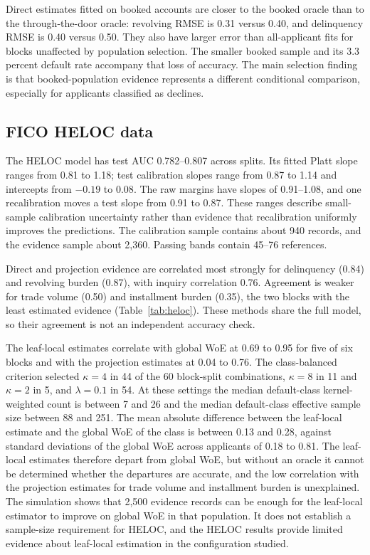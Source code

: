 Direct estimates fitted on booked accounts are closer to the booked oracle than to the through-the-door oracle: revolving RMSE is 0.31 versus 0.40, and delinquency RMSE is 0.40 versus 0.50. They also have larger error than all-applicant fits for blocks unaffected by population selection. The smaller booked sample and its 3.3 percent default rate accompany that loss of accuracy. The main selection finding is that booked-population evidence represents a different conditional comparison, especially for applicants classified as declines.


\subsection{FICO HELOC data}

The HELOC model has test AUC 0.782--0.807 across splits. Its fitted Platt slope ranges from 0.81 to 1.18; test calibration slopes range from 0.87 to 1.14 and intercepts from $-0.19$ to $0.08$. The raw margins have slopes of 0.91--1.08, and one recalibration moves a test slope from 0.91 to 0.87. These ranges describe small-sample calibration uncertainty rather than evidence that recalibration uniformly improves the predictions. The calibration sample contains about 940 records, and the evidence sample about 2{,}360. Passing bands contain 45--76 references.

Direct and projection evidence are correlated most strongly for delinquency (0.84) and revolving burden (0.87), with inquiry correlation 0.76. Agreement is weaker for trade volume (0.50) and installment burden (0.35), the two blocks with the least estimated evidence (Table~\ref{tab:heloc}). These methods share the full model, so their agreement is not an independent accuracy check.

The leaf-local estimates correlate with global WoE at 0.69 to 0.95 for five of six blocks and with the projection estimates at 0.04 to 0.76. The class-balanced criterion selected $\kappa=4$ in 44 of the 60 block-split combinations, $\kappa=8$ in 11 and $\kappa=2$ in 5, and $\lambda=0.1$ in 54. At these settings the median default-class kernel-weighted count is between 7 and 26 and the median default-class effective sample size between 88 and 251. The mean absolute difference between the leaf-local estimate and the global WoE of the class is between 0.13 and 0.28, against standard deviations of the global WoE across applicants of 0.18 to 0.81. The leaf-local estimates therefore depart from global WoE, but without an oracle it cannot be determined whether the departures are accurate, and the low correlation with the projection estimates for trade volume and installment burden is unexplained. The simulation shows that 2{,}500 evidence records can be enough for the leaf-local estimator to improve on global WoE in that population. It does not establish a sample-size requirement for HELOC, and the HELOC results provide limited evidence about leaf-local estimation in the configuration studied.

